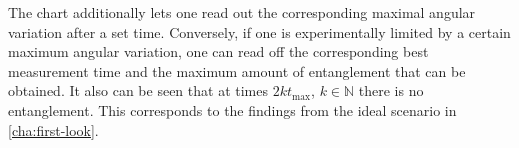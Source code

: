 The chart additionally lets one read out the corresponding maximal angular variation after a set time.
Conversely, if one is experimentally limited by a certain maximum angular variation, one can read off the corresponding best measurement time and the maximum amount of entanglement that can be obtained.
It also can be seen that at times $2k t_\mathrm{max}$, $k\in\mathbb{N}$ there is no entanglement. This corresponds to the findings from the ideal scenario in \cref{cha:first-look}. 